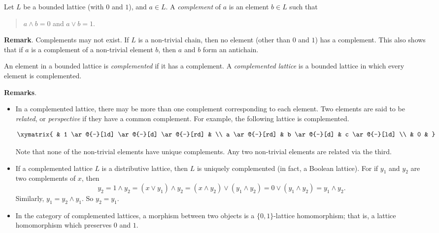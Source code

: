 \documentclass[12pt]{article}
\begin{document}
Let $L$ be a bounded lattice (with $0$ and $1$), and $a\in L$.  A \emph{complement} of $a$ is an element $b\in L$ such that 
\begin{quote}$a\land b=0$ and $a\lor b=1$.\end{quote}

\textbf{Remark}.  Complements may not exist.  If $L$ is a non-trivial chain, then no element (other than $0$ and $1$) has a complement.  This also shows that if $a$ is a complement of a non-trivial element $b$, then $a$ and $b$ form an antichain.

An element in a bounded lattice is \emph{complemented} if it has a complement.  A \emph{complemented lattice} is a bounded lattice in which every element is complemented.


\textbf{Remarks}.
\begin{itemize}
\item In a complemented lattice, there may be more than one complement corresponding to each element.  Two elements are said to be \emph{related}, or \emph{perspective} if they have a common complement.  For example, the following lattice is complemented.

\begin{equation*}
\xymatrix{
& 1 \ar@{-}[ld] \ar@{-}[d] \ar@{-}[rd] & \\
a \ar@{-}[rd] & b \ar@{-}[d] & c \ar@{-}[ld] \\
& 0 &
}
\end{equation*}

Note that none of the non-trivial elements have unique complements.  Any two non-trivial elements are related via the third.
\item If a complemented lattice $L$ is a distributive lattice, then $L$ is uniquely complemented (in fact, a Boolean lattice).  For if $y_1$ and $y_2$ are two complements of $x$, then $$y_2=1\land y_2=(x\lor y_1)\land y_2=
(x\land y_2)\lor(y_1\land y_2)=0\lor(y_1\land y_2)=y_1\land y_2.$$  Similarly, $y_1=y_2\land y_1$. So $y_2=y_1$.
\item In the category of complemented lattices, a morphism between two objects is a $\lbrace 0,1\rbrace$-lattice homomorphism; that is, a lattice homomorphism which preserves $0$ and $1$.
\end{itemize}
\end{document}
